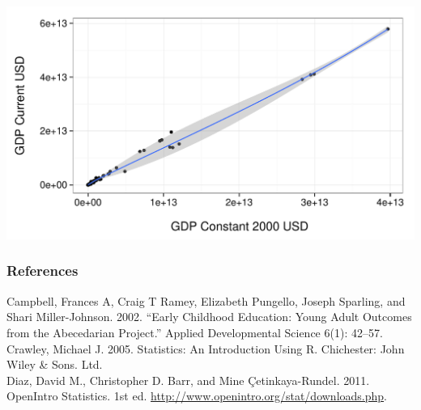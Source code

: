 \documentclass{beamer}\usepackage{graphicx, color}
\makeatletter
\def\maxwidth{ %
  \ifdim\Gin@nat@width>\linewidth
    \linewidth
  \else
    \Gin@nat@width
  \fi
}
\newenvironment{knitrout}{}{} %
\makeatother
\begin{document}
\begin{frame}[fragile]
\begin{knitrout}
\color{fgcolor}

{\centering \includegraphics[width=\maxwidth]{figure/GDP2} 

}


\end{knitrout}

\end{frame}



\begin{frame}[allowframebreaks]
  \frametitle{References}
  Campbell, Frances A, Craig T Ramey, Elizabeth Pungello, Joseph Sparling, and Shari Miller-Johnson. 2002. ``Early Childhood Education: Young Adult Outcomes from the Abecedarian Project.” Applied Developmental Science 6(1): 42–57. \\[0.25cm]
  Crawley, Michael J. 2005. Statistics: An Introduction Using R. Chichester: John Wiley & Sons. Ltd. \\[0.25cm]
  Diaz, David M., Christopher D. Barr, and Mine \c{C}etinkaya-Rundel. 2011. OpenIntro Statistics. 1st ed. \url{http://www.openintro.org/stat/downloads.php}. \\[0.25cm] 
\end{frame}
\end{document}
